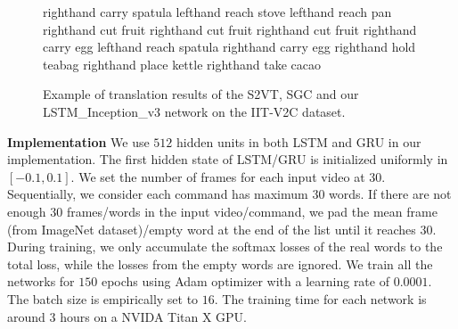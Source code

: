 \begin{figure*}
\centering
\footnotesize
  				  { {righthand carry spatula} {lefthand reach stove} {lefthand reach pan}}
  				  \vspace{2ex} 
  \hspace{0.25cm}%
  				  { {righthand cut fruit} {righthand cut fruit} {righthand cut fruit}}
  				  \vspace{2ex}
    			  { {righthand carry egg} {lefthand reach spatula} {righthand carry egg}}
  				  \vspace{0ex}
  \hspace{0.25cm}%
				  { {righthand hold teabag} {righthand place kettle} {righthand take cacao}}
  				  \vspace{0ex}
  
\vspace{1ex}
\caption{Example of translation results of the S2VT, SGC and our LSTM\_Inception\_v3 network on the IIT-V2C dataset.}

\label{Fig:main_result} 
\end{figure*}


\textbf{Implementation} We use $512$ hidden units in both LSTM and GRU in our implementation. The first hidden state of LSTM/GRU is initialized uniformly in $[-0.1, 0.1]$. We set the number of frames for each input video at $30$. Sequentially, we consider each command has maximum $30$ words. If there are not enough $30$ frames/words in the input video/command, we pad the mean frame (from ImageNet dataset)/empty word at the end of the list until it reaches $30$.  During training, we only accumulate the softmax losses of the real words to the total loss, while the losses from the empty words are ignored. We train all the networks for $150$ epochs using Adam optimizer with a learning rate of $0.0001$. The batch size is empirically set to $16$. The training time for each network is around $3$ hours on a NVIDA Titan X GPU. 


